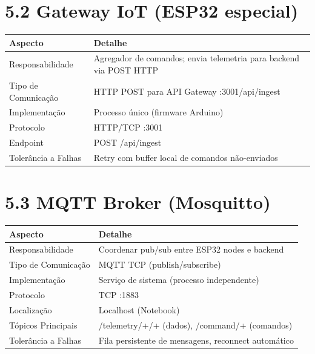 \documentclass[12pt,a4paper,oneside]{report}
\begin{document}
\section{5.2 Gateway IoT (ESP32 especial)}

\begin{center}
\begin{tabular}{|m{3cm}|m{10cm}|}
    \hline
    \rowcolor{lightblue}
    \textbf{Aspecto} & \textbf{Detalhe} \\
    \hline
    Responsabilidade & Agregador de comandos; envia telemetria para backend via POST HTTP \\
    \hline
    Tipo de Comunicação & HTTP POST para API Gateway :3001/api/ingest \\
    \hline
    Implementação & Processo único (firmware Arduino) \\
    \hline
    Protocolo & HTTP/TCP :3001 \\
    \hline
    Endpoint & POST /api/ingest \\
    \hline
    Tolerância a Falhas & Retry com buffer local de comandos não-enviados \\
    \hline
\end{tabular}
\end{center}

\section{5.3 MQTT Broker (Mosquitto)}

\begin{center}
\begin{tabular}{|m{3cm}|m{10cm}|}
    \hline
    \rowcolor{lightblue}
    \textbf{Aspecto} & \textbf{Detalhe} \\
    \hline
    Responsabilidade & Coordenar pub/sub entre ESP32 nodes e backend \\
    \hline
    Tipo de Comunicação & MQTT TCP (publish/subscribe) \\
    \hline
    Implementação & Serviço de sistema (processo independente) \\
    \hline
    Protocolo & TCP :1883 \\
    \hline
    Localização & Localhost (Notebook) \\
    \hline
    Tópicos Principais & /telemetry/+/+ (dados), /command/+ (comandos) \\
    \hline
    Tolerância a Falhas & Fila persistente de mensagens, reconnect automático \\
    \hline
\end{tabular}
\end{center}
\end{document}
